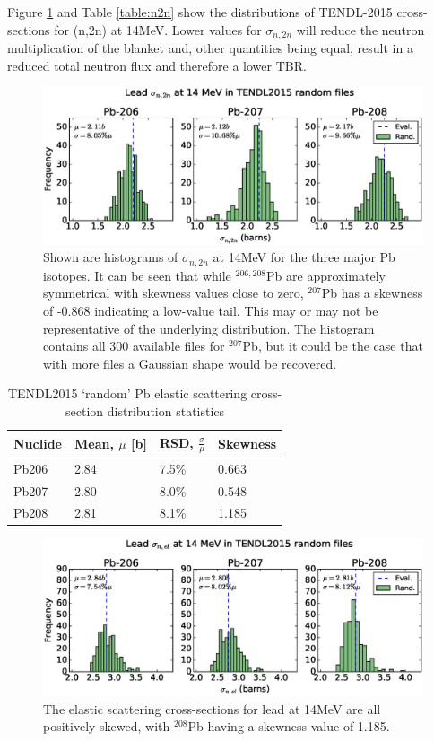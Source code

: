 Figure \ref{fig:tendl_n2n} and Table \ref{table:n2n} show the distributions of TENDL-2015 cross-sections for (n,2n) at 14MeV. Lower values for $\sigma_{n,2n}$ will reduce the neutron multiplication of the blanket and, other quantities being equal, result in a reduced total neutron flux and therefore a lower TBR.

\begin{figure}[ht]
	\includegraphics[width=\textwidth]{pb_tendl_n2n_hist}
	\caption{Shown are histograms of $\sigma_{n,2n}$ at 14MeV for the three major Pb isotopes. It can be seen that while $^{206,208}$Pb are approximately symmetrical with skewness values close to zero, $^{207}$Pb has a skewness of -0.868 indicating a low-value tail. This may or may not be representative of the underlying distribution. The histogram contains all 300 available files for $^{207}$Pb, but it could be the case that with more files a Gaussian shape would be recovered.}
	\label{fig:tendl_n2n}
\end{figure}

\begin{table}[ht]
  \footnotesize
  \centering 
  \begin{tabular}{llll}
    \toprule
    Nuclide & Mean, $\mu$ [b] & RSD, $\frac{\sigma}{\mu}$ & Skewness \\
    \midrule
    Pb206 & 2.84 & 7.5\% & 0.663 \\
    Pb207 & 2.80 & 8.0\% & 0.548 \\
    Pb208 & 2.81 & 8.1\% & 1.185 \\
    \bottomrule
  \end{tabular}
  \caption{TENDL2015 `random' Pb elastic scattering cross-section distribution statistics}
  \label{table:nel}
\end{table}

\begin{figure}[ht]
  \includegraphics[width=\textwidth]{pb_tendl_nel_hist}
  \caption{The elastic scattering cross-sections for lead at 14MeV are all positively skewed, with $^{208}$Pb having a skewness value of 1.185.}
  \label{fig:tendl_nel}
\end{figure}

